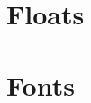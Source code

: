 \documentclass[output=book
	      ,nonflat
	      ,modfonts
	      ]{langsci/langscibook}
\begin{document}
\section{Floats}

\section{Fonts}


% 
% 
%  
%  

% 
% 
%  
%  

\end{document}
